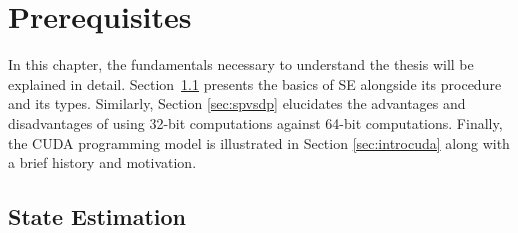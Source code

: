 \documentclass[thesis.tex]{subfiles}
\begin{document}
\chapter{Prerequisites}\label{chap:preq}
In this chapter, the fundamentals necessary to understand the thesis will be explained in detail. Section~\ref{sec:sebasics} presents the basics of SE alongside its procedure and its types. Similarly, Section \ref{sec:spvsdp} elucidates the advantages and disadvantages of using 32-bit computations against 64-bit computations. Finally, the CUDA programming model is illustrated in Section \ref{sec:introcuda} along with a brief history and motivation.

\section{State Estimation}\label{sec:sebasics}
\end{document}
